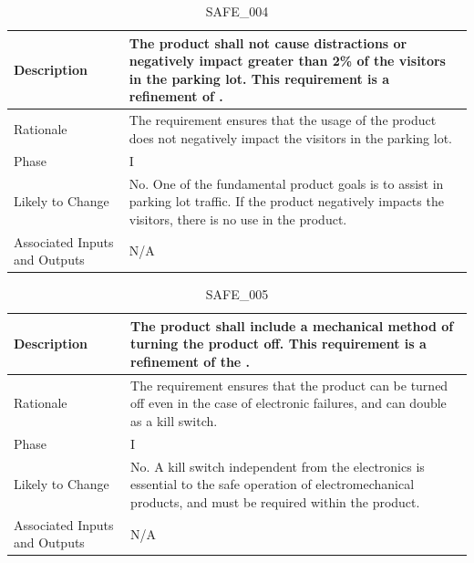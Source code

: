 \documentclass{article}
\begin{document}
\begin{table}[!h]
\begin{center}
\caption {SAFE\_004} 
\label{SAFE_004}
\begin{tabular}{ | m{3cm} | m{11cm} | }
\hline
Description & The product shall not cause distractions or negatively impact greater than 2\% of the visitors in the parking lot. This requirement is a refinement of \nameref{SAFE_001}. \\
\hline
Rationale & The requirement ensures that the usage of the product does not negatively impact the visitors in the parking lot.  \\
\hline
Phase & I \\
\hline
Likely to Change & No. One of the fundamental product goals is to assist in parking lot traffic. If the product negatively impacts the visitors, there is no use in the product. \\
\hline
Associated Inputs and Outputs & N/A \\
\hline
\end{tabular}
\end{center}
\end{table}

\begin{table}[!h]
\begin{center}
\caption {SAFE\_005} 
\label{SAFE_005}
\begin{tabular}{ | m{3cm} | m{11cm} | }
\hline
Description & The product shall include a mechanical method of turning the product off. This requirement is a refinement of the \nameref{Off State}.  \\
\hline
Rationale & The requirement ensures that the product can be turned off even in the case of electronic failures, and can double as a kill switch.  \\
\hline
Phase & I \\
\hline
Likely to Change & No. A kill switch independent from the electronics is essential to the safe operation of electromechanical products, and must be required within the product. \\
\hline
Associated Inputs and Outputs & N/A \\
\hline
\end{tabular}
\end{center}
\end{table}

\clearpage
\newpage
\end{document}
